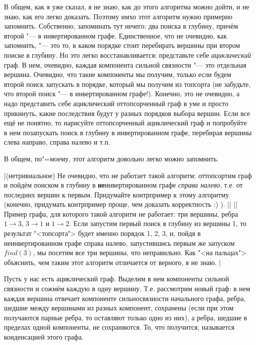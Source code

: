 В общем, как я уже сказал, я не знаю, как до этого алгоритма можно дойти, и не знаю, как его легко доказать. Поэтому
имхо этот алгоритм нужно примерно запомнить. Собственно, запоминать тут нечего: два поиска в глубину, причём второй
"--- в инвертированном графе. Единственное, что не очевидно, как запомнить, "--- это то, в каком порядке стоит перебирать
вершины при втором поиске в глубину. Но это легко восстанавливается: представьте себе \textit{ациклический} граф.
В нем, очевидно, каждая компонента сильной связности "--- это отдельная вершина. Очевидно, что такие компоненты
мы получим, только если будем второй поиск запускать в порядке, который мы получим из топсорта (не забудьте, что 
второй поиск "--- в инвертированном графе!). Конечно, это не очевидно, а надо представить себе ациклический 
оттопсорченный граф в уме и просто прикинуть, какие последствия будут у разных порядков выбора вершин. Если все ещё 
не понятно, то нарисуйте оттопсорченный ациклический граф и попробуйте в нем позапускать поиск в глубину в инвертированном
графе, перебирая вершины слева направо, справа налево и т.п. 

В общем, по"=моему, этот алгоритм довольно легко можно запомнить.

\task|(нетривиальное) Не очевидно, что не работает такой алгоритм: оттопсортим граф и пойдём поиском в глубину в 
\textbf{не}инвертированном графе \emph{справа налево}, т.е. от последних вершин к первым. Придумайте контрпример
к этому алгоритму (конечно, придумать контрпример проще, чем доказать корректность :) ).
||
||Пример графа, для которого такой алгоритм не работает: три вершины, ребра $1\to 3$, $3\to 1$ и $1\to 2$.
Если запустим первый поиск в глубину из вершины 1, то результат "<топсорта"> будет именно порядок 1, 2, 3, и,
пойдя в неинвертированном графе справа налево, запустившись первым же запуском $find(3)$, мы посетим все три
вершины, что неправильно. Как "<на пальцах"> объяснить, чем таким этот алгоритм отличается от верного, я не знаю.
|\label{badSCC}

Пусть у нас есть ациклический граф. Выделим в нем компоненты сильной связности и сожмём каждую в одну вершину. Т.е.
рассмотрим новый граф: в нем каждая вершина отвечает компоненте сильносвязности начального графа, ребра, шедшие между
вершинами из разных компонент, сохранены (если при этом получаются парные ребра, то оставляют только одно из них), а 
ребра, шедшие в пределах одной компоненты, не сохраняются. То, что получится, называется конденсацией этого графа. 
 
